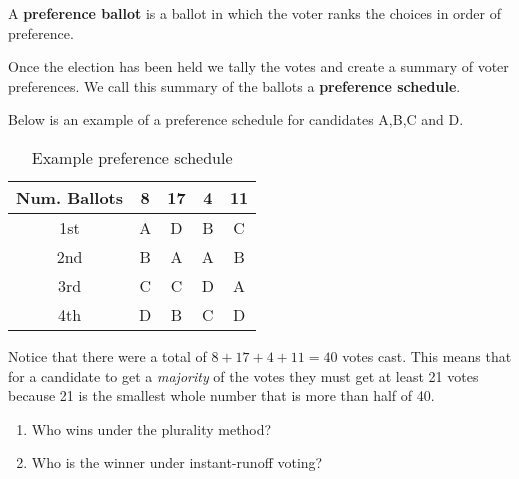 \begin{definition}\label{def:preference-ballot-schedule}
  A \textbf{preference ballot} is a ballot in which the voter ranks
  the choices in order of preference.

  Once the election has been held we tally the votes and create a
  summary of voter preferences. We call this summary of the ballots a
  \textbf{preference schedule}.
\end{definition}

\begin{exercise}
  Below is an example of a preference schedule for candidates A,B,C and D.
  \begin{table}[h]
    \centering
    \begin{tabular}{ccccc}
      \toprule
      Num. Ballots & 8 & 17 & 4 & 11 \\
      \midrule
      1st & A & D & B & C \\
      2nd & B & A & A & B \\
      3rd & C & C & D & A \\
      4th & D & B & C & D \\
      \bottomrule
    \end{tabular}
    \caption{Example preference schedule}%
    \label{tab:example-preference-schedule}
  \end{table}
  Notice that there were a total of \( 8+17+4+11=40 \) votes cast.
  This means that for a candidate to get a \emph{majority} of the
  votes they must get at least 21 votes because 21 is the smallest
  whole number that is more than half of 40.

  \begin{enumerate}
  \item Who wins under the plurality method?


  \item Who is the winner under instant-runoff voting?


  \end{enumerate}
\end{exercise}

\newpage

